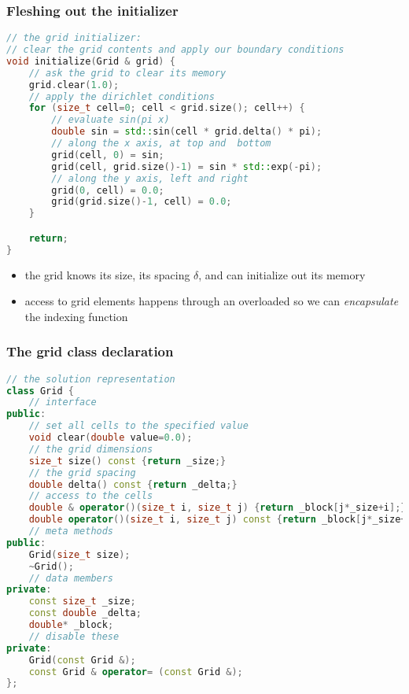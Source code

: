\begin{frame}[fragile]
%
  \frametitle{Fleshing out the initializer}
%
  \begin{lstlisting}[language=c++,name=seq:initializer]
// the grid initializer:
// clear the grid contents and apply our boundary conditions 
void initialize(Grid & grid) {
    // ask the grid to clear its memory
    grid.clear(1.0);
    // apply the dirichlet conditions
    for (size_t cell=0; cell < grid.size(); cell++) {
        // evaluate sin(pi x)
        double sin = std::sin(cell * grid.delta() * pi);
        // along the x axis, at top and  bottom
        grid(cell, 0) = sin;
        grid(cell, grid.size()-1) = sin * std::exp(-pi);
        // along the y axis, left and right
        grid(0, cell) = 0.0;
        grid(grid.size()-1, cell) = 0.0;
    }

    return;
}
  \end{lstlisting}
%
  \begin{itemize}
  \item the grid knows its size, its spacing $\delta$, and can initialize out its  memory
  \item access to grid elements happens through an overloaded  so we can
    {\em encapsulate} the indexing function
  \end{itemize}
%
\end{frame}

\begin{frame}[fragile]
%
  \frametitle{The grid class declaration}
%
  \begin{lstlisting}[language=c++,name=seq:grid,firstnumber=29]
// the solution representation
class Grid {
    // interface
public:
    // set all cells to the specified value
    void clear(double value=0.0);
    // the grid dimensions
    size_t size() const {return _size;}
    // the grid spacing
    double delta() const {return _delta;}
    // access to the cells
    double & operator()(size_t i, size_t j) {return _block[j*_size+i];}
    double operator()(size_t i, size_t j) const {return _block[j*_size+i];}
    // meta methods
public:
    Grid(size_t size);
    ~Grid();
    // data members
private:
    const size_t _size;
    const double _delta;
    double* _block;
    // disable these
private:
    Grid(const Grid &);
    const Grid & operator= (const Grid &);
};

  \end{lstlisting}
%
\end{frame}

